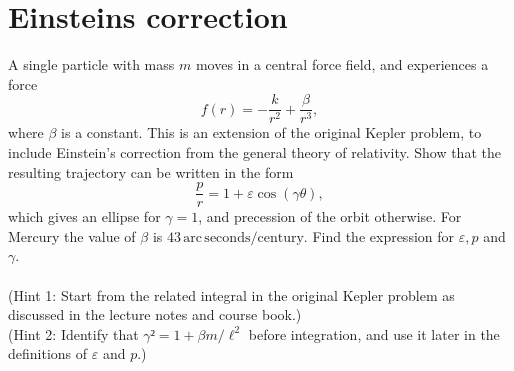 \documentclass{article}
\begin{document}
    \section{Einsteins correction}
        A single particle with mass $m$ moves in a central force field, and experiences a force 
        \begin{equation*}
            f(r) = -\frac{k}{r^2} + \frac{\beta}{r^3},
        \end{equation*}
        where $\beta$ is a constant. This is an extension of the original Kepler problem, to include Einstein's correction from the general theory of relativity. Show that the resulting trajectory can be written in the form 
        \begin{equation*}
            \frac{p}{r} = 1 + \varepsilon \cos(\gamma \theta),
        \end{equation*}
        which gives an ellipse for $\gamma = 1$, and precession of the orbit otherwise. For Mercury the value of $\beta$ is $43 \, \mathrm{arc}\, \mathrm{seconds}/\mathrm{century}$. Find the expression for $\varepsilon, p$ and $\gamma$. \\ \\
        (Hint 1: Start from the related integral in the original Kepler problem as discussed in the lecture notes and course book.) \\
        (Hint 2: Identify that $\gamma² = 1 + \beta m / \ell^2$ before integration, and use it later in the definitions of $\varepsilon$ and $p$.)
\end{document}
